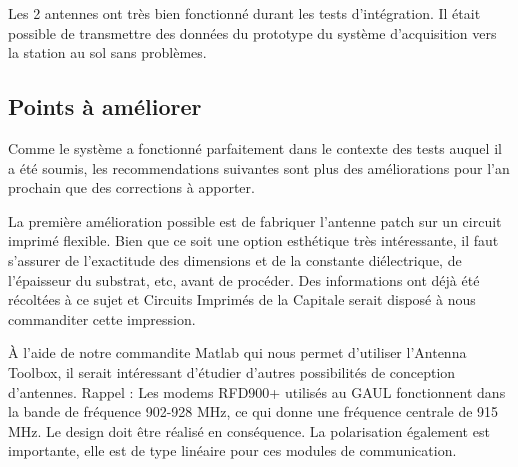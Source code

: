 Les 2 antennes ont très bien fonctionné durant les tests d'intégration. Il
était possible de transmettre des données du prototype du système d'acquisition
vers la station au sol sans problèmes.

\subsection{Points à améliorer}

Comme le système a fonctionné parfaitement dans le contexte des tests auquel il
a été soumis, les recommendations suivantes sont plus des améliorations pour
l'an prochain que des corrections à apporter.
\par
La première amélioration possible est de fabriquer l'antenne patch sur un
circuit imprimé flexible. Bien que ce soit une option esthétique très
intéressante, il faut s'assurer de l'exactitude des dimensions et de la
constante diélectrique, de l'épaisseur du substrat, etc, avant de procéder. Des
informations ont déjà été récoltées à ce sujet et Circuits Imprimés de la
Capitale serait disposé à nous commanditer cette impression.
\par
À l'aide de notre commandite Matlab qui nous permet d'utiliser l'Antenna
Toolbox, il serait intéressant d'étudier d'autres possibilités de conception
d'antennes. Rappel : Les modems RFD900+ utilisés au GAUL fonctionnent dans la
bande de fréquence 902-928 MHz, ce qui donne une fréquence centrale de 915 MHz.
Le design doit être réalisé en conséquence. La polarisation également est
importante, elle est de type linéaire pour ces modules de communication.
